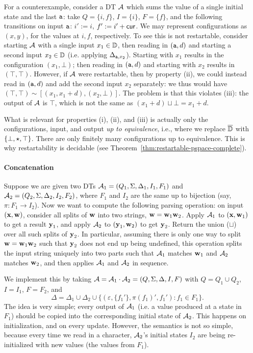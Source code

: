 For a counterexample, consider a DT $\mathcal{A}$ which sums the value of a single initial state and the last ${\texttt{a}}$: take $Q = \{i, f\}$, $I = \{i\}$, $F = \{f\}$, and the following transitions on input ${\texttt{a}}$: $i' := i$, $f' := i' + \mathsf{cur}$. We may represent configurations as $(x,y)$, for the values at $i, f$, respectively. To see this is not restartable, consider starting $\mathcal{A}$ with a single input $x_1 \in \mathbb{D}$, then reading in $({\texttt{a}},d)$ and starting a second input $x_2 \in \mathbb{D}$ (i.e. applying $\Delta_{{\texttt{a}},x_2}$). Starting with $x_1$ results in the configuration $(x_1,\bot)$; then reading in $({\texttt{a}},d)$ and starting with $x_2$ results in $(\top, \top)$. However, if $\mathcal{A}$ were restartable, then by property (ii), we could instead read in $({\texttt{a}},d)$ and add the second input $x_2$ separately: we thus would have $(\top,\top) \sim [(x_1,x_1+d),(x_2,\bot)]$. The problem is that this violates (iii): the output of $\mathcal{A}$ is $\top$, which is not the same as $(x_1 + d) \sqcup \bot = x_1 + d$.

What is relevant for properties (i), (ii), and (iii) is actually only the configurations, input, and output \emph{up to equivalence}, i.e., where we replace $\overline{\mathbb{D}{}}$ with $\{\bot, \star, \top\}$.
There are only finitely many configurations up to equivalence. This is why restartability is decidable (see Theorem~\ref{thm:restartable-pspace-complete}).

\paragraph*{Concatenation}
Suppose we are given two DTs $\mathcal{A}_1 = (Q_{1}, \Sigma, \Delta_{1}, I_{1}, F_{1})$ and $\mathcal{A}_2 = (Q_{2}, \Sigma, \Delta_{2}, I_{2}, F_{2})$, where $F_1$ and $I_2$ are the same up to bijection (say, $\pi: F_1 \to I_2$).
Now we want to compute the following parsing operation: on input $(\textbf{x},\textbf{w})$, consider all splits of $\textbf{w}$ into two strings, $\textbf{w} = \textbf{w}_1 \textbf{w}_2$. Apply $\mathcal{A}_1$ to $(\textbf{x},\textbf{w}_1)$ to get a result $\textbf{y}_1$, and apply $\mathcal{A}_2$ to $(\textbf{y}_1,\textbf{w}_2)$ to get $\textbf{y}_2$. Return the union ($\sqcup$) over all such splits of $\textbf{y}_2$. In particular, assuming there is only one way to split $\textbf{w} = \textbf{w}_1 \textbf{w}_2$ such that $\textbf{y}_2$ does not end up being undefined, this operation splits the input string uniquely into two parts such that $\mathcal{A}_1$ matches $\textbf{w}_1$ and $\mathcal{A}_2$ matches $\textbf{w}_2$, and then applies $\mathcal{A}_1$ and $\mathcal{A}_2$ in sequence.

We implement this by taking $\mathcal{A} = \mathcal{A}_1 \cdot \mathcal{A}_2 = (Q, \Sigma, \Delta, I, F){}$ with $Q = Q_1 \cup Q_2$, $I = I_1$, $F = F_2$, and
\[
\Delta = \Delta_1 \cup \Delta_2 \cup \big\{(\varepsilon, \{f_1'\}, \pi(f_1)', f_1'): f_1 \in F_1 \big\}.
\]
The idea is very simple; every output of $\mathcal{A}_1$ (i.e. a value produced at a state in $F_1$) should be copied into the corresponding initial state of $\mathcal{A}_2$. This happens on initialization, and on every update. However, the semantics is not so simple, because every time we read in a character, $\mathcal{A}_2$'s initial states $I_2$ are being re-initialized with new values (the values from $F_1$).

